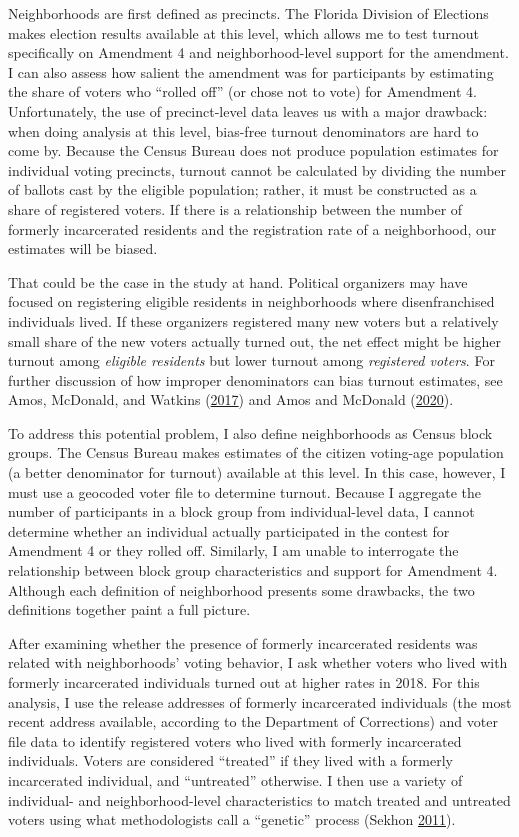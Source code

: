 \documentclass[
  12pt,
]{article}
\begin{document}
Neighborhoods are first defined as precincts. The Florida Division of Elections makes election results available at this level, which allows me to test turnout specifically on Amendment 4 and neighborhood-level support for the amendment. I can also assess how salient the amendment was for participants by estimating the share of voters who ``rolled off'' (or chose not to vote) for Amendment 4. Unfortunately, the use of precinct-level data leaves us with a major drawback: when doing analysis at this level, bias-free turnout denominators are hard to come by. Because the Census Bureau does not produce population estimates for individual voting precincts, turnout cannot be calculated by dividing the number of ballots cast by the eligible population; rather, it must be constructed as a share of registered voters. If there is a relationship between the number of formerly incarcerated residents and the registration rate of a neighborhood, our estimates will be biased.

That could be the case in the study at hand. Political organizers may have focused on registering eligible residents in neighborhoods where disenfranchised individuals lived. If these organizers registered many new voters but a relatively small share of the new voters actually turned out, the net effect might be higher turnout among \emph{eligible residents} but lower turnout among \emph{registered voters}. For further discussion of how improper denominators can bias turnout estimates, see Amos, McDonald, and Watkins (\protect\hyperlink{ref-Amos2017}{2017}) and Amos and McDonald (\protect\hyperlink{ref-Amos2020}{2020}).

To address this potential problem, I also define neighborhoods as Census block groups. The Census Bureau makes estimates of the citizen voting-age population (a better denominator for turnout) available at this level. In this case, however, I must use a geocoded voter file to determine turnout. Because I aggregate the number of participants in a block group from individual-level data, I cannot determine whether an individual actually participated in the contest for Amendment 4 or they rolled off. Similarly, I am unable to interrogate the relationship between block group characteristics and support for Amendment 4. Although each definition of neighborhood presents some drawbacks, the two definitions together paint a full picture.

After examining whether the presence of formerly incarcerated residents was related with neighborhoods' voting behavior, I ask whether voters who lived with formerly incarcerated individuals turned out at higher rates in 2018. For this analysis, I use the release addresses of formerly incarcerated individuals (the most recent address available, according to the Department of Corrections) and voter file data to identify registered voters who lived with formerly incarcerated individuals. Voters are considered ``treated'' if they lived with a formerly incarcerated individual, and ``untreated'' otherwise. I then use a variety of individual- and neighborhood-level characteristics to match treated and untreated voters using what methodologists call a ``genetic'' process (Sekhon \protect\hyperlink{ref-Sekhon2011}{2011}).
\end{document}
